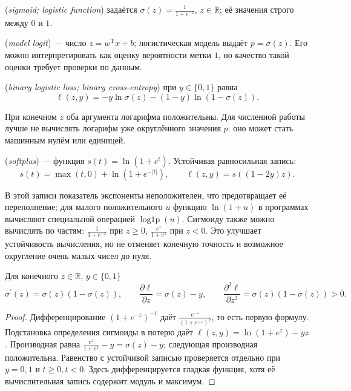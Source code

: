 \begin{definition} (\emph{sigmoid; logistic function}) задаётся \(\sigma(z)=\frac1{1+e^{-z}}\), \(z\in\mathbb R\); её значения строго между \(0\) и \(1\).\end{definition}
\begin{definition} (\emph{model logit}) --- число \(z=w^{\mathrm T}x+b\); логистическая модель выдаёт \(p=\sigma(z)\). Его можно интерпретировать как оценку вероятности метки \(1\), но качество такой оценки требует проверки по данным.\end{definition}
\begin{definition} (\emph{binary logistic loss; binary cross-entropy}) при \(y\in\{0,1\}\) равна
\[\ell(z,y)=-y\ln\sigma(z)-(1-y)\ln(1-\sigma(z)).\]
\end{definition}
При конечном \(z\) оба аргумента логарифма положительны. Для численной работы лучше не вычислять логарифм уже округлённого значения \(p\): оно может стать машинным нулём или единицей.
\begin{definition} (\emph{softplus}) --- функция \(s(t)=\ln(1+e^t)\). Устойчивая равносильная запись:
\[s(t)=\max(t,0)+\ln(1+e^{-|t|}),\qquad \ell(z,y)=s((1-2y)z).\]
\end{definition}
В этой записи показатель экспоненты неположителен, что предотвращает её переполнение; для малого положительного \(u\) функцию \(\ln(1+u)\) в программах вычисляют специальной операцией \(\operatorname{log1p}(u)\). Сигмоиду также можно вычислять по частям: \(\frac1{1+e^{-z}}\) при \(z\ge0\), \(\frac{e^z}{1+e^z}\) при \(z<0\). Это улучшает устойчивость вычисления, но не отменяет конечную точность и возможное округление очень малых чисел до нуля.
\begin{theorem}\label{thm:review-ml-logistic}
Для конечного \(z\in\mathbb R\), \(y\in\{0,1\}\)
\[\sigma^{\prime}(z)=\sigma(z)(1-\sigma(z)),\qquad \frac{\partial\ell}{\partial z}=\sigma(z)-y,\qquad \frac{\partial^2\ell}{\partial z^2}=\sigma(z)(1-\sigma(z))>0.\]
\end{theorem}
\begin{proof}Дифференцирование \((1+e^{-z})^{-1}\) даёт \(\frac{e^{-z}}{(1+e^{-z})^2}\), то есть первую формулу. Подстановка определения сигмоиды в потерю даёт \(\ell(z,y)=\ln(1+e^z)-yz\). Производная равна \(\frac{e^z}{1+e^z}-y=\sigma(z)-y\); следующая производная положительна. Равенство с устойчивой записью проверяется отдельно при \(y=0,1\) и \(t\ge0,t<0\). Здесь дифференцируется гладкая функция, хотя её вычислительная запись содержит модуль и максимум.\end{proof}
